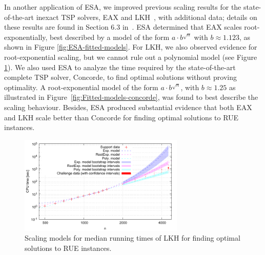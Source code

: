 \documentclass[aic]{iosart2x}
\begin{document}
In another application of ESA, we improved previous scaling results for the state-of-the-art inexact TSP solvers, EAX and LKH~\cite{DubEtAl15}, with additional data; details on these results are found in Section 6.3 in~\cite{Mu15}. ESA determined that EAX scales root-exponentially, best described by a model of the form $a\cdot b^{\sqrt{n}}$ with $b\approx 1.123$, as shown in Figure \ref{fig:ESA-fitted-models}. For LKH, we also observed evidence for root-exponential scaling, but we cannot rule out a polynomial model (see Figure \ref{fig:Fitted-models-LKH}). We also used ESA to analyze the time required by the state-of-the-art complete TSP solver, Concorde, to find optimal solutions without proving optimality. A root-exponential model of the form $a\cdot b^{\sqrt{n}}$, with $b \approx 1.25$ as illustrated in Figure~\ref{fig:Fitted-models-concorde}, was found to best describe the scaling behaviour. Besides, ESA produced substantial evidence that both EAX and LKH scale better than Concorde for finding optimal solutions to RUE instances.
\begin{figure}[t]
\noindent \begin{centering}
\includegraphics[width=0.7\textwidth]{LKH_fittedModels}  \vspace{-5mm} 

\par\end{centering}

\caption{Scaling models for median running times of LKH for finding optimal solutions to RUE instances.}\label{fig:Fitted-models-LKH} 
\end{figure}
\end{document}
